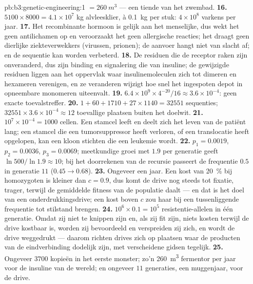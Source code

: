 \begin{solution}{pb:b3:genetic-engineering:1}
$= \qty{260}{m^3}$ --- een tiende van het zwembad.
\textbf{16.} $5100\times 8000 = 4.1\times 10^{7}$ kg alvleesklier, à
\qty{0.1}{kg} per stuk: $4\times 10^{8}$ varkens per jaar.
\textbf{17.} Het recombinante hormoon is gelijk aan het menselijke, dus
wekt het geen antilichamen op en veroorzaakt het geen allergische
reacties; het draagt geen dierlijke ziekteverwekkers (virussen,
prionen); de aanvoer hangt niet van slacht af; en de sequentie kan
worden verbeterd.
\textbf{18.} De residuen die de receptor raken zijn onveranderd, dus
zijn binding en signalering die van insuline; de gewijzigde residuen
liggen aan het oppervlak waar insulinemoleculen zich tot dimeren en
hexameren verenigen, en ze veranderen wijzigt hoe snel het ingespoten
depot in opneembare monomeren uiteenvalt.
\textbf{19.} $6.4\times 10^{9}\times 4^{-20}/16 \approx 3.6\times
10^{-4}$: geen exacte toevalstreffer.
\textbf{20.} $1 + 60 + 1710 + 27\times 1140 = \num{32551}$ sequenties;
$\num{32551}\times 3.6\times 10^{-4} \approx 12$ toevallige plaatsen
buiten het doelwit.
\textbf{21.} $10^{7}\times 10^{-4} = 1000$ cellen. Een stamcel leeft en
deelt zich het leven van de patiënt lang; een stamcel die een
tumorsuppressor heeft verloren, of een translocatie heeft opgelopen,
kan een kloon stichten die een leukemie wordt.
\textbf{22.} $p_{1} = 0.0019$, $p_{2} = 0.0036$, $p_{3} = 0.0069$;
meetkundige groei met $1.9$ per generatie geeft $\ln 500/\ln 1.9
\approx 10$; bij het doorrekenen van de recursie passeert de frequentie
$0.5$ in generatie $11$ ($0.45 \to 0.68$).
\textbf{23.} Ongeveer een jaar. Een kost van \qty{20}{\%} bij
homozygoten is kleiner dan $c = 0.9$, dus komt de drive nog steeds tot
fixatie, trager, terwijl de gemiddelde fitness van de populatie daalt
--- en dat is het doel van een onderdrukkingsdrive; een kost boven $c$
zou haar bij een tussenliggende frequentie tot stilstand brengen.
\textbf{24.} $10^{6}\times 0.1 = 10^{5}$ resistentie-allelen in één
generatie. Omdat zij niet te knippen zijn en, als zij fit zijn, niets
kosten terwijl de drive kostbaar is, worden zij bevoordeeld en
verspreiden zij zich, en wordt de drive weggedrukt --- daarom richten
drives zich op plaatsen waar de producten van de eindverbinding dodelijk
zijn, met verscheidene gidsen tegelijk.
\textbf{25.} Ongeveer $3700$ kopieën in het eerste monster; zo'n
\qty{260}{m^3} fermentor per jaar voor de insuline van de wereld; en
ongeveer $11$ generaties, een muggenjaar, voor de drive.
\end{solution}
